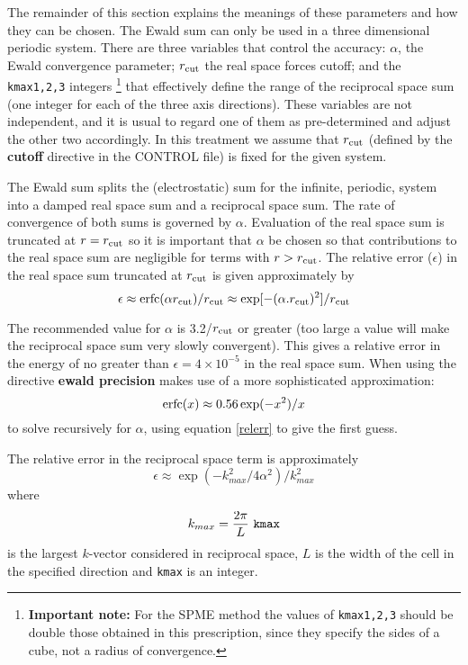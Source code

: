 The remainder of this section explains the meanings of these
parameters and how they can be chosen.  The Ewald
sum can only be used in a three dimensional
periodic system.  There are three variables that control the accuracy:
$\alpha$, the Ewald convergence parameter; $r_{\rm cut}$ the real
space forces cutoff; and the {\tt kmax1,2,3} integers \footnote{{\bf
Important note:} For the SPME method the values of {\tt kmax1,2,3}
should be double those obtained in this prescription, since they
specify the sides of a cube, not a radius of convergence.}  that
effectively define the range of the reciprocal space sum (one integer
for each of the three axis directions).  These variables are not
independent, and it is usual to regard one of them as pre-determined
and adjust the other two accordingly. In this treatment we assume that
$r_{\rm cut}$ (defined by the {\bf cutoff} directive in the CONTROL
file) is fixed for the given system.

The Ewald sum splits the (electrostatic) sum for the infinite,
periodic, system into a damped real space sum and a reciprocal space
sum. The rate of convergence of both sums is governed by $\alpha$.
Evaluation of the real space sum is truncated at $r=r_{\rm cut}$ so it
is important that $\alpha$ be chosen so that contributions to the real
space sum are negligible for terms with $r>r_{\rm cut}$.  The relative
error ($\epsilon$) in the real space sum truncated at $r_{\rm cut}$ is
given approximately by
\begin{equation}
\epsilon \approx {\rm erfc}(\alpha r_{\rm cut})/r_{\rm cut} 
\approx \exp[-(\alpha.r_{\rm cut})^2]/r_{\rm cut} \label{relerr}
\end{equation}

The recommended value for $\alpha$ is 3.2/$r_{\rm cut}$ or greater
(too large a value will make the reciprocal space sum very slowly
convergent). This gives a relative error in the energy of no greater
than $\epsilon = 4\times 10^{-5}$ in the real space sum. When using
the directive {\bf ewald precision} \D{} makes use of a more sophisticated
approximation:
\begin{equation}
{\rm erfc}(x) \approx 0.56 \exp(-x^2)/x
\end{equation}
to solve recursively for $\alpha$, using equation \ref{relerr} to give
the first guess.

The relative error in the reciprocal space term is approximately
\begin{equation}
\epsilon \approx \exp(- k_{max}^2/4\alpha^2)/k_{max}^2
\end{equation}
where
\begin{equation}
k_{max} = \frac{2\pi}{L}~{\tt kmax}
\end{equation}
is the largest $k$-vector considered in reciprocal space, $L$ is the
width of the cell in the specified direction and {\tt kmax} is an integer. 


